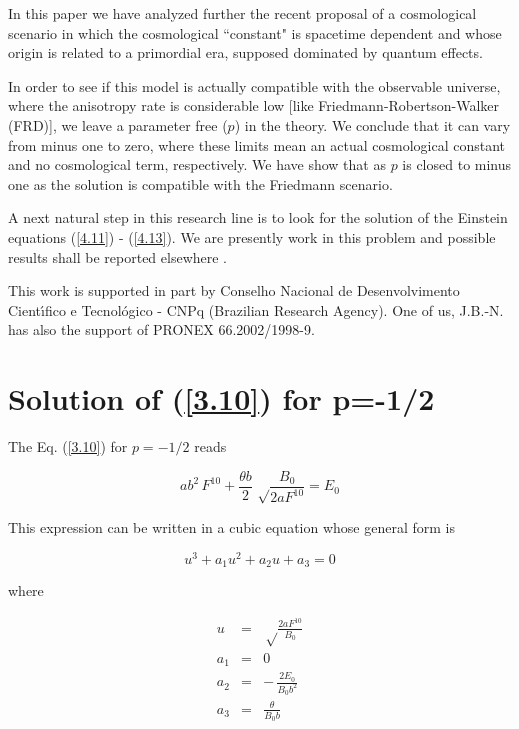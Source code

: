 \documentclass[a4paper,twocolumn,prd,superscriptaddress,nofootinbib,showpacs]
{revtex4}
\begin{document}
In this paper we have analyzed further the recent
proposal\cite{Novello} of a cosmological scenario in which the
cosmological ``constant" is spacetime dependent and whose origin is
related to a primordial era, supposed dominated by quantum effects.

\medskip
In order to see if this model is actually compatible with the
observable universe, where the anisotropy rate is considerable low
[like Friedmann-Robertson-Walker (FRD)], we leave a parameter free
($p$) in the theory. We conclude that it can vary from minus one to
zero, where these limits mean an actual cosmological constant and no
cosmological term, respectively. We have show that as $p$ is closed to
minus one as the solution is compatible with the Friedmann scenario.

\medskip
A next natural step in this research line is to look for the solution
of the Einstein equations (\ref{4.11}) - (\ref{4.13}). We are
presently work in this problem and possible results shall be reported
elsewhere \cite{Novello4}.

\begin{acknowledgments}
This work is supported in part by Conselho Nacional de Desenvolvimento
Cient\'{\i}fico e Tecnol\'ogico - CNPq (Brazilian Research Agency).
One of us, J.B.-N. has also the support of PRONEX 66.2002/1998-9.
\end{acknowledgments}

\appendix
\section {Solution of (\ref{3.10}) for p=-1/2}
\renewcommand{\theequation}{A.\arabic{equation}}
\setcounter{equation}{0}

The Eq. (\ref{3.10}) for $p=-1/2$ reads

\begin{equation}
ab^2\,F^{10}+\frac{\theta b}{2}\,\sqrt\frac{B_0}{2aF^{10}}=E_0
\label{A.1}
\end{equation}

\noindent
This expression can be written in a cubic equation whose general form
is

\begin{equation}
u^3+a_1u^2+a_2u+a_3=0
\label{A.2}
\end{equation}

\noindent
where

\begin{eqnarray}
u&=&\sqrt\frac{2aF^{10}}{B_0}
\nonumber\\
a_1&=&0
\nonumber\\
a_2&=&-\,\frac{2E_0}{B_0b^2}
\nonumber\\
a_3&=&\frac{\theta}{B_0b}
\label{A.3}
\end{eqnarray}
\end{document}
